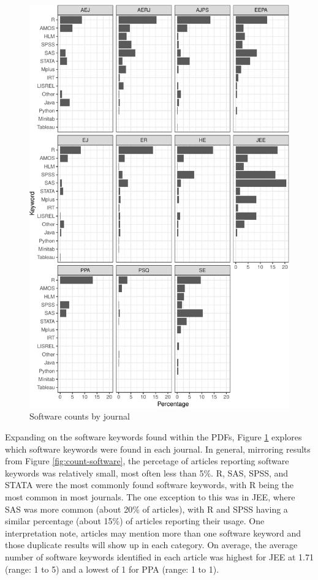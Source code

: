 \documentclass[english,,man]{apa6}
\theoremstyle{definition}
\theoremstyle{definition}
\theoremstyle{definition}
\theoremstyle{remark}
\begin{document}
\begin{figure}
\centering
\includegraphics{software_files/figure-latex/software-journal-1.pdf}
\caption{\label{fig:software-journal}Software counts by journal}
\end{figure}

Expanding on the software keywords found within the PDFs, Figure
\ref{fig:software-journal} explores which software keywords were found
in each journal. In general, mirroring results from Figure
\ref{fig:count-software}, the percetage of articles reporting software
keywords was relatively small, most often less than 5\%. R, SAS, SPSS,
and STATA were the most commonly found software keywords, with R being
the most common in most journals. The one exception to this was in JEE,
where SAS was more common (about 20\% of articles), with R and SPSS
having a similar percentage (about 15\%) of articles reporting their
usage. One interpretation note, articles may mention more than one
software keyword and those duplicate results will show up in each
category. On average, the average number of software keywords identified
in each article was highest for JEE at 1.71 (range: 1 to 5) and a lowest
of 1 for PPA (range: 1 to 1).
\end{document}
